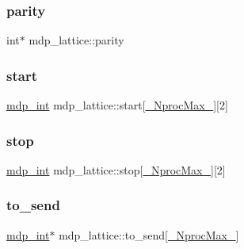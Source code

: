 \subsubsection{\texorpdfstring{parity}{parity}}
{\footnotesize\ttfamily int$\ast$ mdp\+\_\+lattice\+::parity}

\mbox{\label{classmdp__lattice_a63f2a78da171f663b3f038e83192c7e8}} 
\subsubsection{\texorpdfstring{start}{start}}
{\footnotesize\ttfamily \hyperlink{mdp__global__vars_8h_aaa1ad9d0dcd2124aa5af0120d9954174}{mdp\+\_\+int} mdp\+\_\+lattice\+::start\mbox{[}\hyperlink{mdp__global__vars_8h_a2572b6d40c218af44c1f7576ea598f98}{\+\_\+\+Nproc\+Max\+\_\+}\mbox{]}\mbox{[}2\mbox{]}}

\mbox{\label{classmdp__lattice_a34b18f8769d018df30110723799a078d}} 
\subsubsection{\texorpdfstring{stop}{stop}}
{\footnotesize\ttfamily \hyperlink{mdp__global__vars_8h_aaa1ad9d0dcd2124aa5af0120d9954174}{mdp\+\_\+int} mdp\+\_\+lattice\+::stop\mbox{[}\hyperlink{mdp__global__vars_8h_a2572b6d40c218af44c1f7576ea598f98}{\+\_\+\+Nproc\+Max\+\_\+}\mbox{]}\mbox{[}2\mbox{]}}

\mbox{\label{classmdp__lattice_ad3ad7c17679cd144673f6abb9b7201ec}} 
\subsubsection{\texorpdfstring{to\+\_\+send}{to\_send}}
{\footnotesize\ttfamily \hyperlink{mdp__global__vars_8h_aaa1ad9d0dcd2124aa5af0120d9954174}{mdp\+\_\+int}$\ast$ mdp\+\_\+lattice\+::to\+\_\+send\mbox{[}\hyperlink{mdp__global__vars_8h_a2572b6d40c218af44c1f7576ea598f98}{\+\_\+\+Nproc\+Max\+\_\+}\mbox{]}}

\mbox{\label{classmdp__lattice_a14892e721f56e142037c511bf6543e8d}} 

